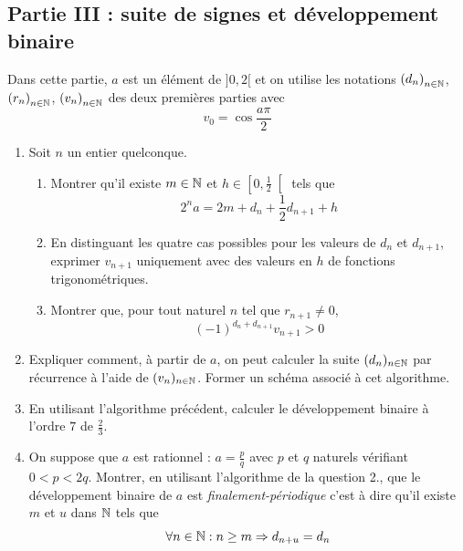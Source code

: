 \subsection*{Partie III : suite de signes et développement binaire}
Dans cette partie, $a$ est un {\'e}l{\'e}ment de $] 0,2[$ et on utilise les notations  $\left( d_n\right) _{n\in \mathbb{N}}$,  $\left( r_n\right) _{n\in \mathbb{N}}$,  $\left( v_n\right) _{n\in \mathbb{N}}$ des deux premières parties avec
\begin{displaymath}
v_0=\cos \frac{a\pi}{2} 
\end{displaymath}
\begin{enumerate}
\item  Soit $n$ un entier quelconque.
\begin{enumerate}
 \item Montrer qu'il existe $m\in \mathbb{N}$ et $h\in \left[ 0,\frac{1}{2}\right[ $ tels que
\begin{displaymath}
2^{n}a =2m+d_{n}+\frac{1}{2}d_{n+1}+h 
\end{displaymath}
\item En distinguant les quatre cas possibles pour les valeurs de $d_n$ et $d_{n+1}$, exprimer $v_{n+1}$ uniquement avec des valeurs en $h$ de fonctions trigonométriques.
\item Montrer que, pour tout naturel $n$ tel que $r_{n+1}\neq 0$,
\begin{displaymath}
(-1)^{d_n + d_{n+1}}v_{n+1} > 0       
\end{displaymath}
\end{enumerate}
\item  Expliquer comment, à partir de $a$, on peut calculer la suite $(d_{n})_{n\in \mathbb{N}}$ par r{\'e}currence {\`a} l'aide de $(v_{n})_{n\in \mathbb{N}}$. Former un schéma associé à cet algorithme.

\item  En utilisant l'algorithme pr{\'e}c{\'e}dent, calculer le d{\'e}veloppement binaire {\`a} l'ordre $7$ de $\frac{2}{3}$.
\item On suppose que $a$ est rationnel : $a=\frac{p}{q}$ avec $p$ et $q$ naturels vérifiant $0<p<2q$. Montrer, en utilisant l'algorithme de la question 2., que le développement binaire de $a$ est \emph{finalement-périodique} c'est à dire qu'il existe $m$ et $u$ dans $\mathbb{N}$ tels que 
\begin{displaymath}
 \forall n\in \mathbb{N} : n\geq m \Rightarrow d_{n+u} = d_n
\end{displaymath}
\end{enumerate}
